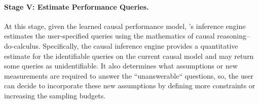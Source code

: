 


    


\paragraph{Stage V: Estimate Performance Queries.}
\label{sect:path_discovery}
At this stage, given the learned causal performance model, \ourapproach's inference engine estimates the user-specified queries using the mathematics of causal reasoning--do-calculus.
Specifically, the causal inference engine provides a quantitative estimate for the identifiable queries on the current causal model and may return some queries as unidentifiable. It also determines what assumptions or new measurements are required to answer the ``unanswerable`` questions, so, the user can decide to incorporate these new assumptions by defining more constraints or increasing the sampling budgets.


